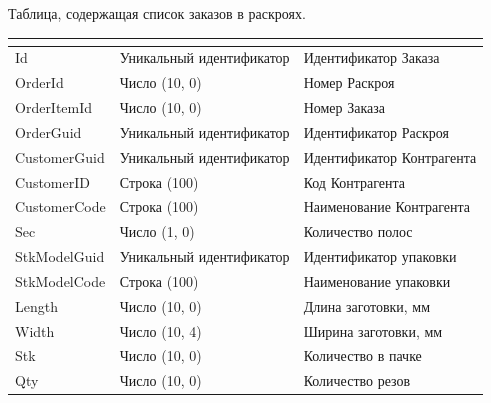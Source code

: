 \normalsize



Таблица, содержащая список заказов в раскроях.

\scriptsize
\begin{longtable}{|p{56mm}|p{56mm}|p{56mm}|}
\hline
{\bf \parbox[c][5mm]{56mm}{}} & {\bf \parbox[c]{56mm}{}} & {\bf \parbox[c]{56mm}{}} \\
\hline
\parbox[c][5mm]{56mm}{Id} & \parbox{56mm}{Уникальный идентификатор} & \parbox{56mm}{Идентификатор Заказа} \\
\hline
\parbox[c][5mm]{56mm}{OrderId} & \parbox{56mm}{Число (10, 0)} & \parbox{56mm}{Номер Раскроя} \\
\hline
\parbox[c][5mm]{56mm}{OrderItemId} & \parbox{56mm}{Число (10, 0)} & \parbox{56mm}{Номер Заказа} \\
\hline
\parbox[c][5mm]{56mm}{OrderGuid} & \parbox{56mm}{Уникальный идентификатор} & \parbox{56mm}{Идентификатор Раскроя} \\
\hline
\parbox[c][5mm]{56mm}{CustomerGuid} & \parbox{56mm}{Уникальный идентификатор} & \parbox{56mm}{Идентификатор Контрагента} \\
\hline
\parbox[c][5mm]{56mm}{CustomerID} & \parbox{56mm}{Строка (100)} & \parbox{56mm}{Код Контрагента} \\
\hline
\parbox[c][5mm]{56mm}{CustomerCode} & \parbox{56mm}{Строка (100)} & \parbox{56mm}{Наименование Контрагента} \\
\hline
\parbox[c][5mm]{56mm}{Sec} & \parbox{56mm}{Число (1, 0)} & \parbox{56mm}{Количество полос} \\
\hline
\parbox[c][5mm]{56mm}{StkModelGuid} & \parbox{56mm}{Уникальный идентификатор} & \parbox{56mm}{Идентификатор упаковки} \\
\hline
\parbox[c][5mm]{56mm}{StkModelCode} & \parbox{56mm}{Строка (100)} & \parbox{56mm}{Наименование упаковки} \\
\hline
\parbox[c][5mm]{56mm}{Length} & \parbox{56mm}{Число (10, 0)} & \parbox{56mm}{Длина заготовки, мм} \\
\hline
\parbox[c][5mm]{56mm}{Width} & \parbox{56mm}{Число (10, 4)} & \parbox{56mm}{Ширина заготовки, мм} \\
\hline
\parbox[c][5mm]{56mm}{Stk} & \parbox{56mm}{Число (10, 0)} & \parbox{56mm}{Количество в пачке} \\
\hline
\parbox[c][5mm]{56mm}{Qty} & \parbox{56mm}{Число (10, 0)} & \parbox{56mm}{Количество резов} \\

\end{longtable}
